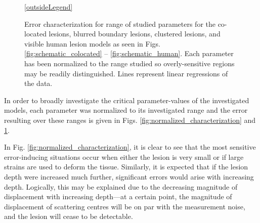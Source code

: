 \begin{figure}[!htb]

				\ref{outsideLegend}
				\caption[Error characterization for: co-located, blurred boundary, clustered, and visible human lesion models]{Error characterization for range of studied parameters for the co-located lesions, blurred boundary lesions, clustered lesions, and visible human lesion models as seen in Figs. \ref{fig:schematic_colocated} -- \ref{fig:schematic_human}. Each parameter has been normalized to the range studied so overly-sensitive regions may be readily distinguished. Lines represent linear regressions of the data.}
				\label{fig:normalized_characterization_extras}
			\end{figure}

			In order to broadly investigate the critical parameter-values of the investigated models, each parameter was normalized to its investigated range and the error resulting over these ranges is given in Figs. \ref{fig:normalized_characterization} and \ref{fig:normalized_characterization_extras}.

			In Fig. \ref{fig:normalized_characterization}, it is clear to see that the most sensitive error-inducing situations occur when either the lesion is very small or if large strains are used to deform the tissue. Similarly, it is expected that if the lesion depth were increased much further, significant errors would arise with increasing depth. Logically, this may be explained due to the decreasing magnitude of displacement with increasing depth---at a certain point, the magnitude of displacement of scattering centres will be on par with the measurement noise, and the lesion will cease to be detectable.

